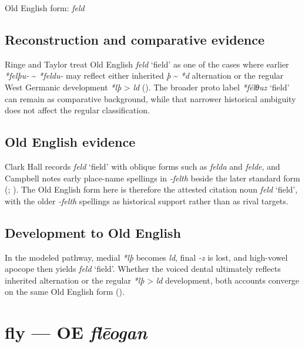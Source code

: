 \documentclass[
  british,
  a4paper,
  openany]{book}
\providecommand{\Recon}[1]{\emph{*#1}}
{\catcode`→=\active \global\def→{\ensuremath{\rightarrow}}}
\providecommand{\texorpdfstring}[2]{#1}
\providecommand{\Recon}[1]{\emph{*#1}}
{\catcode`→=\active \global\def→{\ensuremath{\rightarrow}}}
\begin{document}
Old English form: \emph{feld}

\subsection{Reconstruction and comparative
evidence}\label{reconstruction-and-comparative-evidence-17}

Ringe and Taylor treat Old English {\emph{feld}} `field' as one of the
cases where earlier \emph{*felþu-} \textasciitilde{} \emph{*feldu-} may
reflect either inherited \emph{þ} \textasciitilde{} \emph{*d}
alternation or the regular West Germanic development \emph{*lþ}
\textgreater{} \emph{ld} (). The broader proto label \Recon{félθuz} `field' can
remain as comparative background, while that narrower historical
ambiguity does not affect the regular classification.

\subsection{Old English evidence}\label{old-english-evidence-17}

Clark Hall records {\emph{feld}} `field' with oblique forms such as
\emph{felda} and \emph{felde}, and Campbell notes early place-name
spellings in \emph{-felth} beside the later standard form
(;
). The Old English form
here is therefore the attested citation noun {\emph{feld}} `field', with
the older \emph{-felth} spellings as historical support rather than as
rival targets.

\subsection{Development to Old
English}\label{development-to-old-english-17}

In the modeled pathway, medial \emph{*lþ} becomes \emph{ld}, final
\emph{-z} is lost, and high-vowel apocope then yields {\emph{feld}}
`field'. Whether the voiced dental ultimately reflects inherited
alternation or the regular \emph{*lþ} \textgreater{} \emph{ld}
development, both accounts converge on the same Old English form
().

\section{\texorpdfstring{fly --- OE
\emph{flēogan}}{fly --- OE flēogan}}\label{fly-oe-flux113ogan}
\end{document}
